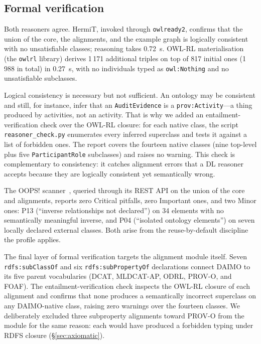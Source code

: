 \documentclass[Afour,sagev,times]{sagej}
\newcommand{\code}[1]{\texttt{#1}}
\begin{document}
\subsection{Formal verification}\label{sec:eval-engineering}

Both reasoners agree. HermiT, invoked through \code{owlready2}, confirms that the union of the core, the alignments, and the example graph is logically consistent with no unsatisfiable classes; reasoning takes 0.72~s. OWL-RL materialisation (the \code{owlrl} library) derives 1\,171 additional triples on top of 817 initial ones (1\,988 in total) in 0.27~s, with no individuals typed as \code{owl:Nothing} and no unsatisfiable subclasses.

Logical consistency is necessary but not sufficient. An ontology may be consistent and still, for instance, infer that an \code{AuditEvidence} is a \code{prov:Activity}---a thing produced by activities, not an activity. That is why we added an entailment-verification check over the OWL-RL closure: for each native class, the script \code{reasoner\_check.py} enumerates every inferred superclass and tests it against a list of forbidden ones. The report covers the fourteen native classes (nine top-level plus five \code{ParticipantRole} subclasses) and raises no warning. This check is complementary to consistency: it catches alignment errors that a DL reasoner accepts because they are logically consistent yet semantically wrong.

The OOPS! scanner~\cite{oops14}, queried through its REST API on the union of the core and alignments, reports zero Critical pitfalls, zero Important ones, and two Minor ones: P13 (``inverse relationships not declared'') on 34 elements with no semantically meaningful inverse, and P04 (``isolated ontology elements'') on seven locally declared external classes. Both arise from the reuse-by-default discipline the profile applies.

The final layer of formal verification targets the alignment module itself. Seven \code{rdfs:subClassOf} and six \code{rdfs:subPropertyOf} declarations connect DAIMO to its five parent vocabularies (DCAT, MLDCAT-AP, ODRL, PROV-O, and FOAF). The entailment-verification check inspects the OWL-RL closure of each alignment and confirms that none produces a semantically incorrect superclass on any DAIMO-native class, raising zero warnings over the fourteen classes. We deliberately excluded three subproperty alignments toward PROV-O from the module for the same reason: each would have produced a forbidden typing under RDFS closure (§\ref{sec:axiomatic}).
\end{document}
